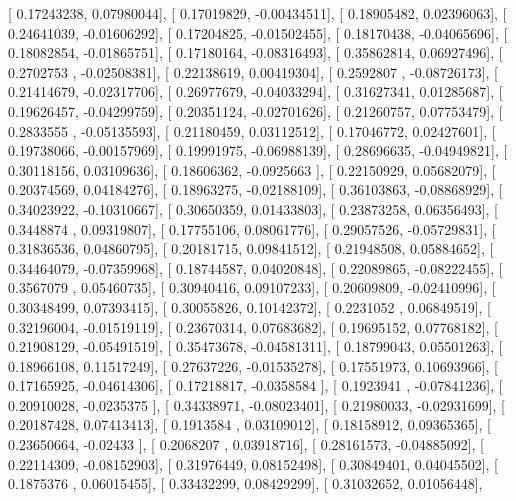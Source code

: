 \documentclass{article}
\begin{document}
       [ 0.17243238,  0.07980044],
       [ 0.17019829, -0.00434511],
       [ 0.18905482,  0.02396063],
       [ 0.24641039, -0.01606292],
       [ 0.17204825, -0.01502455],
       [ 0.18170438, -0.04065696],
       [ 0.18082854, -0.01865751],
       [ 0.17180164, -0.08316493],
       [ 0.35862814,  0.06927496],
       [ 0.2702753 , -0.02508381],
       [ 0.22138619,  0.00419304],
       [ 0.2592807 , -0.08726173],
       [ 0.21414679, -0.02317706],
       [ 0.26977679, -0.04033294],
       [ 0.31627341,  0.01285687],
       [ 0.19626457, -0.04299759],
       [ 0.20351124, -0.02701626],
       [ 0.21260757,  0.07753479],
       [ 0.2833555 , -0.05135593],
       [ 0.21180459,  0.03112512],
       [ 0.17046772,  0.02427601],
       [ 0.19738066, -0.00157969],
       [ 0.19991975, -0.06988139],
       [ 0.28696635, -0.04949821],
       [ 0.30118156,  0.03109636],
       [ 0.18606362, -0.0925663 ],
       [ 0.22150929,  0.05682079],
       [ 0.20374569,  0.04184276],
       [ 0.18963275, -0.02188109],
       [ 0.36103863, -0.08868929],
       [ 0.34023922, -0.10310667],
       [ 0.30650359,  0.01433803],
       [ 0.23873258,  0.06356493],
       [ 0.3448874 ,  0.09319807],
       [ 0.17755106,  0.08061776],
       [ 0.29057526, -0.05729831],
       [ 0.31836536,  0.04860795],
       [ 0.20181715,  0.09841512],
       [ 0.21948508,  0.05884652],
       [ 0.34464079, -0.07359968],
       [ 0.18744587,  0.04020848],
       [ 0.22089865, -0.08222455],
       [ 0.3567079 ,  0.05460735],
       [ 0.30940416,  0.09107233],
       [ 0.20609809, -0.02410996],
       [ 0.30348499,  0.07393415],
       [ 0.30055826,  0.10142372],
       [ 0.2231052 ,  0.06849519],
       [ 0.32196004, -0.01519119],
       [ 0.23670314,  0.07683682],
       [ 0.19695152,  0.07768182],
       [ 0.21908129, -0.05491519],
       [ 0.35473678, -0.04581311],
       [ 0.18799043,  0.05501263],
       [ 0.18966108,  0.11517249],
       [ 0.27637226, -0.01535278],
       [ 0.17551973,  0.10693966],
       [ 0.17165925, -0.04614306],
       [ 0.17218817, -0.0358584 ],
       [ 0.1923941 , -0.07841236],
       [ 0.20910028, -0.0235375 ],
       [ 0.34338971, -0.08023401],
       [ 0.21980033, -0.02931699],
       [ 0.20187428,  0.07413413],
       [ 0.1913584 ,  0.03109012],
       [ 0.18158912,  0.09365365],
       [ 0.23650664, -0.02433   ],
       [ 0.2068207 ,  0.03918716],
       [ 0.28161573, -0.04885092],
       [ 0.22114309, -0.08152903],
       [ 0.31976449,  0.08152498],
       [ 0.30849401,  0.04045502],
       [ 0.1875376 ,  0.06015455],
       [ 0.33432299,  0.08429299],
       [ 0.31032652,  0.01056448],
\end{document}
